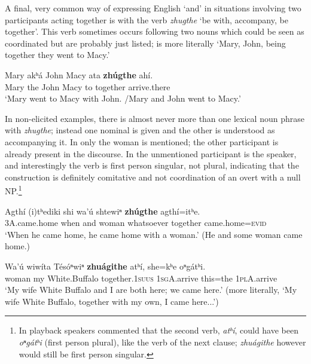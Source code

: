 \documentclass[output=paper]{LSP/langsci}
\begin{document}
 A final, very common way of expressing English `and' in situations involving two participants acting together is with the verb \textit{zhugthe} `be with, accompany, be together'. This verb sometimes occurs following two nouns which could be seen as coordinated but are probably just listed;  is more literally `Mary, John, being together they went to Macy.'

\begin{exe}	
\ex
\gll Mary akʰ\'a  John	Macy ata 	\textbf{zh\'ugthe} 	ah\'i. \\
Mary the John Macy to  together arrive.there \\
\trans `Mary went to Macy with John. /Mary and John went to Macy.'
\end{exe}

In non-elicited examples, there is almost never more than one lexical noun phrase with \textit{zhugthe}; instead one nominal is given and the other is understood as accompanying it. In  only the woman is mentioned; the other participant is already present in the discourse. In  the unmentioned participant is the speaker, and interestingly the verb is first person singular, not plural, indicating that the construction is definitely comitative and not coordination of an overt with a null NP.\footnote{In playback speakers commented that the second verb, \textit{atʰ\'i}, could have been \textit{oⁿg\'atʰi} (first person plural), like the verb of the next clause; \textit{zhu\'agithe} however would still be first person singular.}   

\begin{exe}	
\ex
\gll Agth\'i (i)tʰediki shi wa'\'u shtewiⁿ \textbf{zh\'ugthe} agth\'i=itʰe. \\
\textsc{3A}.came.home 	when and woman whatsoever together came.home=\textsc{evid} \\
\vspace{-2.5em}\trans `When he came home, he came home with a woman.' (He and some woman came home.)

\ex
\gll Wa'\'u  wiw\'ita T\'es\'oⁿwiⁿ \textbf{zhu\'agithe}  atʰ\'i, she=kʰe oⁿg\'atʰi. \\
woman 	my  White.Buffalo together.1\textsc{suus}  \textsc{1sgA}.arrive	this=the 	\textsc{1plA}.arrive \\
\trans `My wife White Buffalo and I are both here; we came here.' (more literally, `My wife White Buffalo, together with my own, I came here...')
\end{exe}
\end{document}
